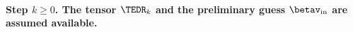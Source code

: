 \begin{mylist}

\end{mylist}

\paragraph{Step \( k \geq 0 \). The tensor \( \TEDR_{k} \) and the preliminary guess \( \betav_{\init} \)
are assumed available.}

